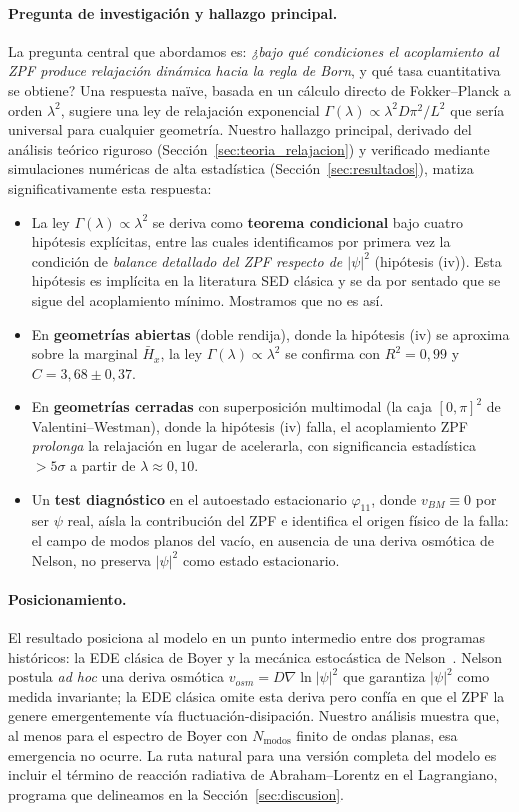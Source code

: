 \documentclass[11pt,a4paper]{article}
\begin{document}
\paragraph{Pregunta de investigación y hallazgo principal.}
La pregunta central que abordamos es: \emph{¿bajo qué condiciones el
acoplamiento al ZPF produce relajación dinámica hacia la regla de Born},
y qué tasa cuantitativa se obtiene? Una respuesta naïve, basada en un
cálculo directo de Fokker--Planck a orden $\lambda^2$, sugiere una ley
de relajación exponencial $\Gamma(\lambda)\propto\lambda^2 D\pi^2/L^2$
que sería universal para cualquier geometría. Nuestro hallazgo principal,
derivado del análisis teórico riguroso
(Sección~\ref{sec:teoria_relajacion}) y verificado mediante simulaciones
numéricas de alta estadística (Sección~\ref{sec:resultados}), matiza
significativamente esta respuesta:
\begin{itemize}
\item La ley $\Gamma(\lambda)\propto\lambda^2$ se deriva como
\textbf{teorema condicional} bajo cuatro hipótesis explícitas, entre las
cuales identificamos por primera vez la condición de \emph{balance
detallado del ZPF respecto de $|\psi|^2$} (hipótesis (iv)). Esta
hipótesis es implícita en la literatura SED clásica y se da por sentado
que se sigue del acoplamiento mínimo. Mostramos que no es así.
\item En \textbf{geometrías abiertas} (doble rendija), donde la
hipótesis (iv) se aproxima sobre la marginal $\bar{H}_x$, la ley
$\Gamma(\lambda)\propto\lambda^2$ se confirma con $R^2=0{,}99$ y
$C=3{,}68\pm 0{,}37$.
\item En \textbf{geometrías cerradas} con superposición multimodal (la
caja $[0,\pi]^2$ de Valentini--Westman), donde la hipótesis (iv) falla,
el acoplamiento ZPF \emph{prolonga} la relajación en lugar de
acelerarla, con significancia estadística $>5\sigma$ a partir de
$\lambda\approx 0{,}10$.
\item Un \textbf{test diagnóstico} en el autoestado estacionario
$\varphi_{11}$, donde $v_{BM}\equiv 0$ por ser $\psi$ real, aísla la
contribución del ZPF e identifica el origen físico de la falla: el campo
de modos planos del vacío, en ausencia de una deriva osmótica de Nelson,
no preserva $|\psi|^2$ como estado estacionario.
\end{itemize}

\paragraph{Posicionamiento.}
El resultado posiciona al modelo en un punto intermedio entre dos
programas históricos: la EDE clásica de Boyer y la mecánica estocástica
de Nelson~\cite{Nelson1966}. Nelson postula \emph{ad hoc} una deriva
osmótica $v_{osm}=D\nabla\ln|\psi|^2$ que garantiza $|\psi|^2$ como
medida invariante; la EDE clásica omite esta deriva pero confía en que
el ZPF la genere emergentemente vía fluctuación-disipación. Nuestro
análisis muestra que, al menos para el espectro de Boyer con
$N_\text{modos}$ finito de ondas planas, esa emergencia no ocurre. La
ruta natural para una versión completa del modelo es incluir el término
de reacción radiativa de Abraham--Lorentz en el Lagrangiano, programa
que delineamos en la Sección~\ref{sec:discusion}.
\end{document}
